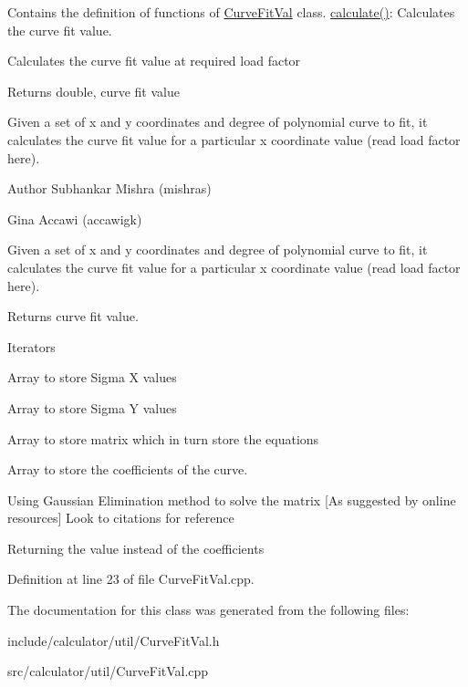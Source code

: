 Contains the definition of functions of \hyperlink{class_curve_fit_val}{Curve\+Fit\+Val} class. \hyperlink{class_curve_fit_val_ab4692d5c52b77dc03caf7b45f6377ba8}{calculate()}\+: Calculates the curve fit value. 

Calculates the curve fit value at required load factor \begin{DoxyReturn}{Returns}
double, curve fit value
\end{DoxyReturn}
Given a set of x and y coordinates and degree of polynomial curve to fit, it calculates the curve fit value for a particular x coordinate value (read load factor here).

\begin{DoxyAuthor}{Author}
Subhankar Mishra (mishras) 

Gina Accawi (accawigk) 
\end{DoxyAuthor}
Given a set of x and y coordinates and degree of polynomial curve to fit, it calculates the curve fit value for a particular x coordinate value (read load factor here). \begin{DoxyReturn}{Returns}
curve fit value. 
\end{DoxyReturn}
Iterators

Array to store Sigma X values

Array to store Sigma Y values

Array to store matrix which in turn store the equations

Array to store the coefficients of the curve.

Using Gaussian Elimination method to solve the matrix \mbox{[}As suggested by online resources\mbox{]} Look to citations for reference

Returning the value instead of the coefficients

Definition at line 23 of file Curve\+Fit\+Val.\+cpp.



The documentation for this class was generated from the following files\+:\begin{DoxyCompactItemize}
\item 
include/calculator/util/Curve\+Fit\+Val.\+h\item 
src/calculator/util/Curve\+Fit\+Val.\+cpp\end{DoxyCompactItemize}
